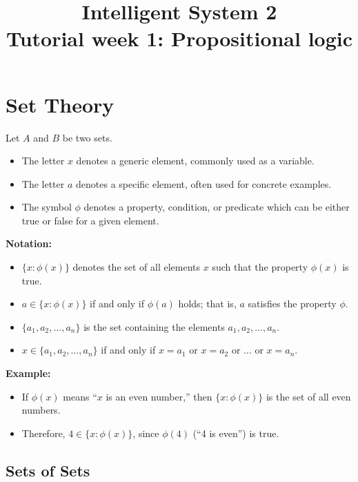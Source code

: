 \documentclass[11pt]{article}
\title{
    Intelligent System 2\\
    Tutorial week 1: Propositional logic
}
\begin{document}
    \maketitle

    \section{Set Theory}
    \label{sec:set-theory}

    Let $A$ and $B$ be two sets.
    \begin{itemize}
        \item The letter $x$ denotes a generic element, commonly used as a variable.
        \item The letter $a$ denotes a specific element, often used for concrete examples.
        \item The symbol $\phi$ denotes a property, condition, or predicate which can be either true or false for a given element.
    \end{itemize}

    \textbf{Notation:}
    \begin{itemize}
        \item $\{x : \phi(x)\}$ denotes the set of all elements $x$ such that the property $\phi(x)$ is true.
        \item $a \in \{x : \phi(x)\}$ if and only if $\phi(a)$ holds; that is, $a$ satisfies the property $\phi$.
        \item $\{a_1, a_2, \dots, a_n\}$ is the set containing the elements $a_1, a_2, \dots, a_n$.
        \item $x \in \{a_1, a_2, \dots, a_n\}$ if and only if $x = a_1$ or $x = a_2$ or $\dots$ or $x = a_n$.
    \end{itemize}

    \textbf{Example:}
    \begin{itemize}
        \item If $\phi(x)$ means ``$x$ is an even number,'' then $\{x : \phi(x)\}$ is the set of all even numbers.
        \item Therefore, $4 \in \{x : \phi(x)\}$, since $\phi(4)$ (``4 is even'') is true.
    \end{itemize}

    \subsection{Sets of Sets}
    \label{subsec:sets-of-sets}
\end{document}
